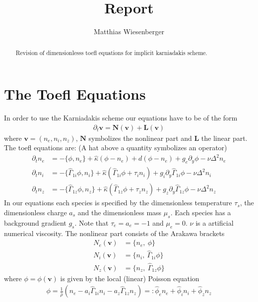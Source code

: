 \documentclass[a4paper,12pt]{scrartcl}
\title{Report}
\author{Matthias  Wiesenberger}
\renewcommand{\vec}[1]{{\mathbf{#1}}}
\begin{document}
\maketitle

\begin{abstract}
    Revision of dimensionlesss toefl equations for implicit karniadakis scheme.
\end{abstract}

\section{The Toefl Equations}

In order to use the Karniadakis scheme our equations have to be of the form 
\begin{align}
 \partial_t \vec v = \vec N(\vec v) + \vec L( \vec v)
\end{align}
where $\vec v = (n_e, n_i, n_z)$, $\vec N$ symbolizes the nonlinear part and $\vec L$ the linear part. 
The toefl equations are: (A hat above a quantity symbolizes an operator)
\begin{subequations}
\begin{align}
    \partial_t n_e &= -\{\phi,n_e\} +\hat\kappa(\phi - n_e) + d(\phi - n_e) + g_e\partial_y\phi - \nu\Delta^2n_e \\
    \partial_t n_i &= -\{\hat\Gamma_{1i}\phi,n_i\} +\hat\kappa(\hat\Gamma_{1i}\phi +\tau_i n_i) + g_i\partial_y\hat\Gamma_{1i}\phi - \nu\Delta^2n_i \\
    \partial_t n_z &= -\{\hat\Gamma_{1z}\phi,n_z\} +\hat\kappa(\hat\Gamma_{1z}\phi +\tau_z n_z) + g_z\partial_y\hat\Gamma_{1z}\phi - \nu\Delta^2n_z
\end{align}
\label{eq:toefl_equations}
\end{subequations}
In our equations each species is specified by the dimensionless temperature $\tau_s$, the
dimensionless charge $a_s$ and the dimensionless mass $\mu_s$. Each species
has a background gradient $g_s$. Note that 
$\tau_e = a_e = -1$ and $\mu_e = 0$. $\nu$ is a artificial numerical viscosity.
The nonlinear part consists of the Arakawa brackets
\begin{align}
    N_e(\vec v) &= \{n_e,\ \phi\}\\
    N_i(\vec v) &= \{n_i,\ \hat\Gamma_{1i}\phi\}\\
    N_z(\vec v) &= \{n_z,\ \hat\Gamma_{1z}\phi\}
\end{align}
where $\phi = \phi(\vec v)$ is given by the local (linear) Poisson equation
\begin{align}
    \phi = \frac{1}{\hat\rho}(n_e -a_i\hat\Gamma_{1i}n_i -a_z\hat\Gamma_{1z}n_z) =: \hat\phi_e n_e + \hat\phi_i n_i + \hat\phi_z n_z
\end{align}
\end{document}
